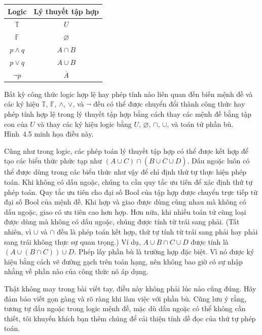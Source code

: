 \begin{center}
\begin{tabular}{cc}
\toprule
\textbf{Logic} & \textbf{Lý thuyết tập hợp} \\
\midrule
$\mathbb{T}$ & $U$ \\
$\mathbb{F}$ & $\varnothing$ \\
$p \land q$ & $A \cap B$ \\
$p \lor q$ & $A \cup B$ \\
$\neg p$ & $\overline{A}$ \\
\bottomrule
\end{tabular}
\end{center}

Bất kỳ công thức logic hợp lệ hay phép tính nào liên quan đến biến mệnh đề và các ký hiệu $\mathbb{T}$, $\mathbb{F}$, $\land$, $\lor$, và $\neg$ đều có thể được chuyển đổi thành công thức hay phép tính hợp lệ trong lý thuyết tập hợp bằng cách thay các mệnh đề bằng tập con của $U$ và thay các ký hiệu logic bằng $U$, $\varnothing$, $\cap$, $\cup$, và toán tử phần bù. Hình~4.5 minh họa điều này.

Cũng như trong logic, các phép toán lý thuyết tập hợp có thể được kết hợp để tạo các biểu thức phức tạp như $(A \cup C) \cap (B \cup \overline{C} \cup D)$. Dấu ngoặc luôn có thể được dùng trong các biểu thức như vậy để chỉ định thứ tự thực hiện phép toán. Khi không có dấu ngoặc, chúng ta cần quy tắc ưu tiên để xác định thứ tự phép toán. Quy tắc ưu tiên cho đại số Bool của tập hợp được chuyển trực tiếp từ đại số Bool của mệnh đề. Khi hợp và giao được dùng cùng nhau mà không có dấu ngoặc, giao có ưu tiên cao hơn hợp. Hơn nữa, khi nhiều toán tử cùng loại được dùng mà không có dấu ngoặc, chúng được tính từ trái sang phải. (Tất nhiên, vì $\cup$ và $\cap$ đều là phép toán kết hợp, thứ tự tính từ trái sang phải hay phải sang trái không thực sự quan trọng.) Ví dụ, $A \cup B \cap C \cup D$ được tính là $(A \cup (B \cap C)) \cup D$. Phép lấy phần bù là trường hợp đặc biệt. Vì nó được ký hiệu bằng cách vẽ đường gạch trên toán hạng, nên không bao giờ có sự nhập nhằng về phần nào của công thức nó áp dụng.

\begin{warningbox}
Thật không may trong bài viết tay, điều này không phải lúc nào cũng đúng. Hãy đảm bảo viết gọn gàng và rõ ràng khi làm việc với phần bù. Cũng lưu ý rằng, tương tự dấu ngoặc trong logic mệnh đề, mặc dù dấu ngoặc có thể không cần thiết, tôi khuyến khích bạn thêm chúng để cải thiện tính dễ đọc của thứ tự phép toán.
\end{warningbox}

